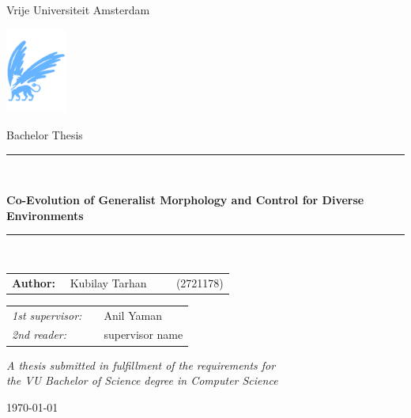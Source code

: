 \documentclass[11pt]{article}
\begin{document}
\thispagestyle{empty}

\begin{center}

      Vrije Universiteit Amsterdam

      \vspace{1mm}

      \includegraphics[height=28mm]{./resources/vu-griffioen.pdf}

      \vspace{1.5cm}

      {\Large Bachelor Thesis}

      \vspace*{1.5cm}

      \rule{.9\linewidth}{.6pt}\\[0.4cm]
      {\huge \bfseries Co-Evolution of Generalist Morphology and Control for Diverse Environments\par}
      \vspace{0.4cm}
      \rule{.9\linewidth}{.6pt}\\[1.5cm]

      \vspace*{2mm}

      {\Large
            \begin{tabular}{l}
                  {\bf Author:} ~~Kubilay Tarhan ~~~~ (2721178)
            \end{tabular}
      }

      \vspace*{1.5cm}

      \begin{tabular}{ll}
            {\it 1st supervisor:}   & ~~Anil Yaman                               \\
            {\it 2nd reader:}       & ~~supervisor name
      \end{tabular}

      \vspace*{2cm}

      \textit{A thesis submitted in fulfillment of the requirements for\\ the VU Bachelor of Science degree in Computer Science }

      \vspace*{1cm}

      \today\\[4cm] %

\end{center}

\twocolumn









\printbibliography
\end{document}
